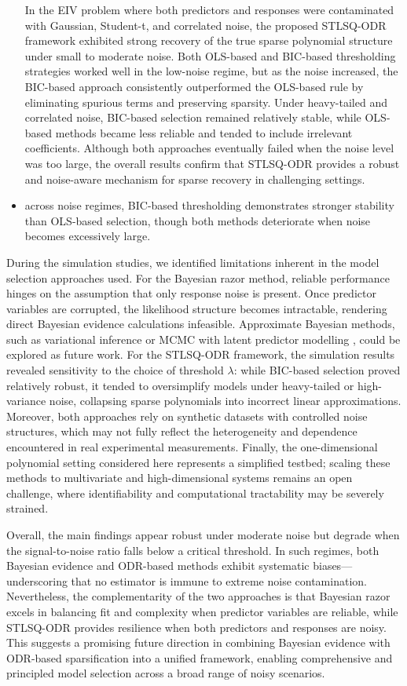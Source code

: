 \begin{itemize}
    In the EIV problem where both predictors and responses were contaminated with Gaussian, Student-t, and correlated noise, the proposed STLSQ-ODR framework exhibited strong recovery of the true sparse polynomial structure under small to moderate noise. Both OLS-based and BIC-based thresholding strategies worked well in the low-noise regime, but as the noise increased, the BIC-based approach consistently outperformed the OLS-based rule by eliminating spurious terms and preserving sparsity. Under heavy-tailed and correlated noise, BIC-based selection remained relatively stable, while OLS-based methods became less reliable and tended to include irrelevant coefficients. Although both approaches eventually failed when the noise level was too large, the overall results confirm that STLSQ-ODR provides a robust and noise-aware mechanism for sparse recovery in challenging settings.
    \item across noise regimes, BIC-based thresholding demonstrates stronger stability than OLS-based selection, though both methods deteriorate when noise becomes excessively large.
\end{itemize}

During the simulation studies, we identified limitations inherent in the model selection approaches used. For the Bayesian razor method, reliable performance hinges on the assumption that only response noise is present. Once predictor variables are corrupted, the likelihood structure becomes intractable, rendering direct Bayesian evidence calculations infeasible. Approximate Bayesian methods, such as variational inference or MCMC with latent predictor modelling \citep{gunapati2022}, could be explored as future work. For the STLSQ-ODR framework, the simulation results revealed sensitivity to the choice of threshold $\lambda$: while BIC-based selection proved relatively robust, it tended to oversimplify models under heavy-tailed or high-variance noise, collapsing sparse polynomials into incorrect linear approximations. Moreover, both approaches rely on synthetic datasets with controlled noise structures, which may not fully reflect the heterogeneity and dependence encountered in real experimental measurements. Finally, the one-dimensional polynomial setting considered here represents a simplified testbed; scaling these methods to multivariate and high-dimensional systems remains an open challenge, where identifiability and computational tractability may be severely strained.

Overall, the main findings appear robust under moderate noise but degrade when the signal-to-noise ratio falls below a critical threshold. In such regimes, both Bayesian evidence and ODR-based methods exhibit systematic biases—underscoring that no estimator is immune to extreme noise contamination. Nevertheless, the complementarity of the two approaches is that Bayesian razor excels in balancing fit and complexity when predictor variables are reliable, while STLSQ-ODR provides resilience when both predictors and responses are noisy. This suggests a promising future direction in combining Bayesian evidence with ODR-based sparsification into a unified framework, enabling comprehensive and principled model selection across a broad range of noisy scenarios.